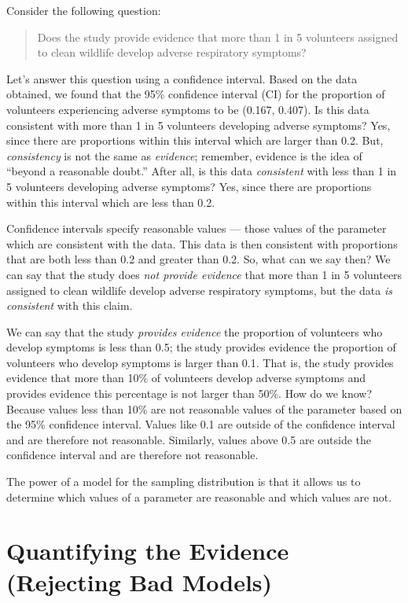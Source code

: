 \documentclass[
  letterpaper,
  DIV=11,
  numbers=noendperiod]{scrreprt}
\theoremstyle{definition}
\theoremstyle{definition}
\theoremstyle{plain}
\theoremstyle{remark}
\begin{document}
Consider the following question:

\begin{quote}
Does the study provide evidence that more than 1 in 5 volunteers
assigned to clean wildlife develop adverse respiratory symptoms?
\end{quote}

Let's answer this question using a confidence interval. Based on the
data obtained, we found that the 95\% confidence interval (CI) for the
proportion of volunteers experiencing adverse symptoms to be (0.167,
0.407). Is this data consistent with more than 1 in 5 volunteers
developing adverse symptoms? Yes, since there are proportions within
this interval which are larger than 0.2. But, \emph{consistency} is not
the same as \emph{evidence}; remember, evidence is the idea of ``beyond
a reasonable doubt.'' After all, is this data \emph{consistent} with
less than 1 in 5 volunteers developing adverse symptoms? Yes, since
there are proportions within this interval which are less than 0.2.

Confidence intervals specify reasonable values --- those values of the
parameter which are consistent with the data. This data is then
consistent with proportions that are both less than 0.2 and greater than
0.2. So, what can we say then? We can say that the study does \emph{not
provide evidence} that more than 1 in 5 volunteers assigned to clean
wildlife develop adverse respiratory symptoms, but the data \emph{is
consistent} with this claim.

We can say that the study \emph{provides evidence} the proportion of
volunteers who develop symptoms is less than 0.5; the study provides
evidence the proportion of volunteers who develop symptoms is larger
than 0.1. That is, the study provides evidence that more than 10\% of
volunteers develop adverse symptoms and provides evidence this
percentage is not larger than 50\%. How do we know? Because values less
than 10\% are not reasonable values of the parameter based on the 95\%
confidence interval. Values like 0.1 are outside of the confidence
interval and are therefore not reasonable. Similarly, values above 0.5
are outside the confidence interval and are therefore not reasonable.

The power of a model for the sampling distribution is that it allows us
to determine which values of a parameter are reasonable and which values
are not.

\chapter{Quantifying the Evidence (Rejecting Bad
Models)}\label{sec-nulldistns}
\end{document}
